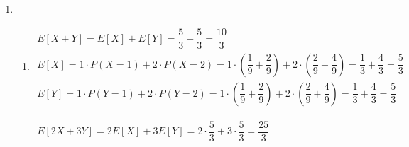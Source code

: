 \begin{enumerate}[label=\color{red}\arabic*), leftmargin=*]
	$\begin{array}{l}
	E[XY^2]=E[X]\cdot E[Y^2]=\lb{(\ast)}=\dfrac{1}{2}\cdot\dfrac{1}{3}=\dfrac{1}{6}\\
	E[X]=\int_{0}^{1}x\dx=\left[\dfrac{x^2}{2}\right]_0^1=\dfrac{1}{2}\\
	E[Y^2]=\int_{0}^{1}y^2\dy=\left[\dfrac{y^3}{3}\right]_0^1=\dfrac{1}{3}
	\end{array}$
	\item {}
	\begin{enumerate}[label=\color{red}\alph*)]
		\item {}
		
		$\begin{array}{l}
		E[X+Y]=E[X]+E[Y]=\dfrac{5}{3}+\dfrac{5}{3}=\dfrac{10}{3}\\
		E[X]=1\cdot P(X=1)+2\cdot P(X=2)=1\cdot\left(\dfrac{1}{9}+\dfrac{2}{9}\right)+2\cdot\left(\dfrac{2}{9}+\dfrac{4}{9}\right)=\dfrac{1}{3}+\dfrac{4}{3}=\dfrac{5}{3}\\
		E[Y]=1\cdot P(Y=1)+2\cdot P(Y=2)=1\cdot\left(\dfrac{1}{9}+\dfrac{2}{9}\right)+2\cdot\left(\dfrac{2}{9}+\dfrac{4}{9}\right)=\dfrac{1}{3}+\dfrac{4}{3}=\dfrac{5}{3}
		\end{array}$
		
		$\begin{array}{l}
		E[2X+3Y]=2E[X]+3E[Y]=2\cdot\dfrac{5}{3}+3\cdot\dfrac{5}{3}=\dfrac{25}{3}
		\end{array}$
		

\end{enumerate}
\end{enumerate}
